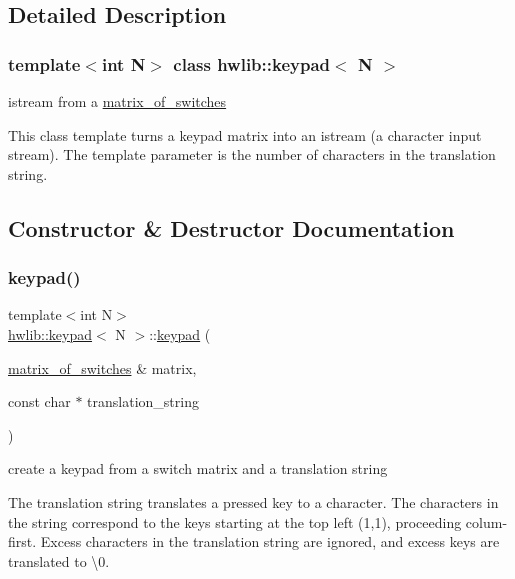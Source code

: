 \subsection{Detailed Description}
\subsubsection*{template$<$int N$>$\newline
class hwlib\+::keypad$<$ N $>$}

istream from a \hyperlink{classhwlib_1_1matrix__of__switches}{matrix\+\_\+of\+\_\+switches} 

This class template turns a keypad matrix into an istream (a character input stream). The template parameter is the number of characters in the translation string. 

\subsection{Constructor \& Destructor Documentation}
\mbox{\label{classhwlib_1_1keypad_a6bb965d7739192e6868a392697b6863c}} 
\subsubsection{\texorpdfstring{keypad()}{keypad()}}
{\footnotesize\ttfamily template$<$int N$>$ \\
\hyperlink{classhwlib_1_1keypad}{hwlib\+::keypad}$<$ N $>$\+::\hyperlink{classhwlib_1_1keypad}{keypad} (\begin{DoxyParamCaption}\item[{\hyperlink{classhwlib_1_1matrix__of__switches}{matrix\+\_\+of\+\_\+switches} \&}]{matrix,  }\item[{const char $\ast$}]{translation\+\_\+string }\end{DoxyParamCaption})\hspace{0.3cm}{\ttfamily [inline]}}



create a keypad from a switch matrix and a translation string 

The translation string translates a pressed key to a character. The characters in the string correspond to the keys starting at the top left (1,1), proceeding colum-\/first. Excess characters in the translation string are ignored, and excess keys are translated to \textquotesingle{}\textbackslash{}0\textquotesingle{}. 

